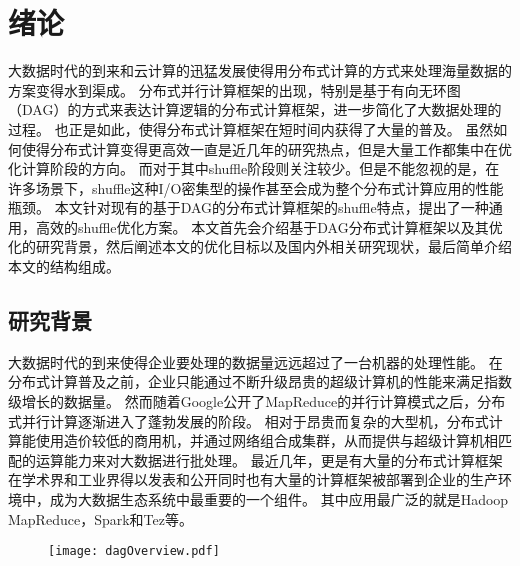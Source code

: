 
\chapter{绪论}
\label{chap:intro}

大数据时代的到来和云计算的迅猛发展使得用分布式计算的方式来处理海量数据的方案变得水到渠成。
分布式并行计算框架的出现，特别是基于有向无环图（DAG）的方式来表达计算逻辑的分布式计算框架，进一步简化了大数据处理的过程。
也正是如此，使得分布式计算框架在短时间内获得了大量的普及。
虽然如何使得分布式计算变得更高效一直是近几年的研究热点，但是大量工作都集中在优化计算阶段的方向。
而对于其中shuffle阶段则关注较少。但是不能忽视的是，在许多场景下，shuffle这种I/O密集型的操作甚至会成为整个分布式计算应用的性能瓶颈。
本文针对现有的基于DAG的分布式计算框架的shuffle特点，提出了一种通用，高效的shuffle优化方案。
本文首先会介绍基于DAG分布式计算框架以及其优化的研究背景，然后阐述本文的优化目标以及国内外相关研究现状，最后简单介绍本文的结构组成。

\section{研究背景}

大数据时代的到来使得企业要处理的数据量远远超过了一台机器的处理性能。
在分布式计算普及之前，企业只能通过不断升级昂贵的超级计算机的性能来满足指数级增长的数据量。
然而随着Google公开了MapReduce\cite{mapreduce}的并行计算模式之后，分布式并行计算逐渐进入了蓬勃发展的阶段。
相对于昂贵而复杂的大型机，分布式计算能使用造价较低的商用机，并通过网络组合成集群，从而提供与超级计算机相匹配的运算能力来对大数据进行批处理。
最近几年，更是有大量的分布式计算框架在学术界和工业界得以发表和公开同时也有大量的计算框架被部署到企业的生产环境中，成为大数据生态系统中最重要的一个组件。
其中应用最广泛的就是Hadoop MapReduce\cite{mapreduce}，Spark\cite{apachespark}和Tez\cite{tez}等。

\begin{figure}[!htp]
	\centering
	\texttt{[image: dagOverview.pdf]}
\end{figure}

